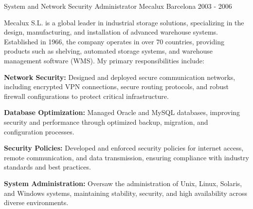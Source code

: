 \documentclass[11pt, a4paper]{awesome-cv}
\begin{document}
\begin{cventries}
    \cventry
    {System and Network Security Administrator} %
    {Mecalux} %
    {Barcelona} %
    {2003 - 2006} %
    {
    	Mecalux S.L. is a global leader in industrial storage solutions, specializing in the design, manufacturing, and installation of advanced warehouse systems. Established in 1966, the company operates in over 70 countries, providing products such as shelving, automated storage systems, and warehouse management software (WMS). My primary responsibilities include:
    	\vspace{15pt}
        \begin{cvitems} %
		    \item \textbf{Network Security:} Designed and deployed secure communication networks, including encrypted VPN connections, secure routing protocols, and robust firewall configurations to protect critical infrastructure.
		    \item \textbf{Database Optimization:} Managed Oracle and MySQL databases, improving security and performance through optimized backup, migration, and configuration processes.
		    \item \textbf{Security Policies:} Developed and enforced security policies for internet access, remote communication, and data transmission, ensuring compliance with industry standards and best practices.
		    \item \textbf{System Administration:} Oversaw the administration of Unix, Linux, Solaris, and Windows systems, maintaining stability, security, and high availability across diverse environments.
        \end{cvitems}
    }


\end{cventries}
\end{document}
